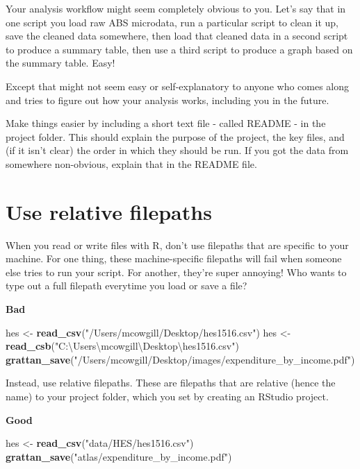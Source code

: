 \documentclass[]{book}
\newenvironment{Shaded}{\begin{snugshade}}{\end{snugshade}}
\newcommand{\KeywordTok}[1]{\textcolor[rgb]{0.13,0.29,0.53}{\textbf{#1}}}
\newcommand{\NormalTok}[1]{#1}
\newcommand{\StringTok}[1]{\textcolor[rgb]{0.31,0.60,0.02}{#1}}
\begin{document}
Your analysis workflow might seem completely obvious to you. Let's say that in one script you load raw ABS microdata, run a particular script to clean it up, save the cleaned data somewhere, then load that cleaned data in a second script to produce a summary table, then use a third script to produce a graph based on the summary table. Easy!

Except that might not seem easy or self-explanatory to anyone who comes along and tries to figure out how your analysis works, including you in the future.

Make things easier by including a short text file - called README - in the project folder. This should explain the purpose of the project, the key files, and (if it isn't clear) the order in which they should be run. If you got the data from somewhere non-obvious, explain that in the README file.

\hypertarget{use-relative-filepaths}{%
\section{Use relative filepaths}\label{use-relative-filepaths}}

When you read or write files with R, don't use filepaths that are specific to your machine. For one thing, these machine-specific filepaths will fail when someone else tries to run your script. For another, they're super annoying! Who wants to type out a full filepath everytime you load or save a file?

\textbf{Bad}

\begin{Shaded}
\begin{Highlighting}[]
\NormalTok{hes <-}\StringTok{ }\KeywordTok{read_csv}\NormalTok{(}\StringTok{"/Users/mcowgill/Desktop/hes1516.csv"}\NormalTok{)}
\NormalTok{hes <-}\StringTok{ }\KeywordTok{read_csb}\NormalTok{(}\StringTok{"C:\textbackslash{}Users\textbackslash{}mcowgill\textbackslash{}Desktop\textbackslash{}hes1516.csv"}\NormalTok{)}
\KeywordTok{grattan_save}\NormalTok{(}\StringTok{"/Users/mcowgill/Desktop/images/expenditure_by_income.pdf"}\NormalTok{)}
\end{Highlighting}
\end{Shaded}

Instead, use relative filepaths. These are filepaths that are relative (hence the name) to your project folder, which you set by creating an RStudio project.

\textbf{Good}

\begin{Shaded}
\begin{Highlighting}[]
\NormalTok{hes <-}\StringTok{ }\KeywordTok{read_csv}\NormalTok{(}\StringTok{"data/HES/hes1516.csv"}\NormalTok{)}
\KeywordTok{grattan_save}\NormalTok{(}\StringTok{"atlas/expenditure_by_income.pdf"}\NormalTok{)}
\end{Highlighting}
\end{Shaded}
\end{document}
